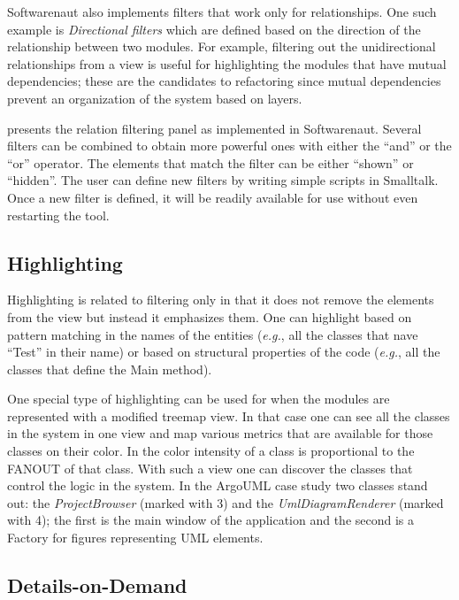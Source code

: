 \documentclass[preprint,12pt]{elsarticle}
\newcommand{\cd}[1]{{\em{#1}}}
\newcommand{\eg}{\emph{e.g.},\xspace}
\begin{document}
Softwarenaut also implements filters that work only for relationships. One such example is {\em Directional filters} which are defined based on the direction of the relationship between two modules. For example, filtering out the unidirectional relationships from a view is useful for highlighting the modules that have mutual dependencies; these are the candidates to refactoring since mutual dependencies prevent an organization of the system based on layers.

 presents the relation filtering panel as implemented in Softwarenaut. Several filters can be combined to obtain more powerful ones with either the ``and'' or the ``or'' operator. The elements that match the filter can be either ``shown'' or ``hidden''. The user can define new filters by writing simple scripts in Smalltalk. Once a new filter is defined, it will be readily available for use without even restarting the tool.


\subsection {Highlighting}
Highlighting is related to filtering only in that it does not remove the elements from the view but instead it emphasizes them. One can highlight based on pattern matching in the names of the entities (\eg all the classes that nave ``Test'' in their name) or based on structural properties of the code (\eg all the classes that define the Main method). 

One special type of highlighting can be used for when the modules are represented with a modified treemap view. In that case one can see all the classes in the system in one view and map various metrics that are available for those classes on their color. In  the color intensity of a class is proportional to the FANOUT of that class. With such a view one can discover the classes that control the logic in the system. In the ArgoUML case study two classes stand out: the \cd{ProjectBrowser} (marked with 3) and the \cd{UmlDiagramRenderer} (marked with 4); the first is the main window of the application and the second is a Factory for figures representing UML elements.


\subsection {Details-on-Demand} 
\end{document}
